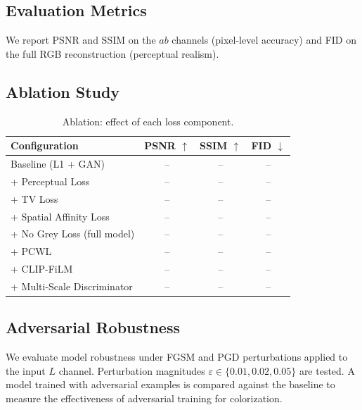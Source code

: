 \documentclass[conference]{IEEEtran}
\begin{document}
\subsection{Evaluation Metrics}

We report PSNR and SSIM on the $ab$ channels (pixel-level accuracy) and
FID \cite{heusel2017gans} on the full RGB reconstruction (perceptual realism).

\subsection{Ablation Study}

\begin{table}[H]
    \centering
    \caption{Ablation: effect of each loss component.}
    \begin{tabular}{lccc}
        \toprule
        \textbf{Configuration} & \textbf{PSNR} $\uparrow$ & \textbf{SSIM} $\uparrow$ & \textbf{FID} $\downarrow$ \\
        \midrule
        Baseline (L1 + GAN)              & -- & -- & -- \\
        + Perceptual Loss                & -- & -- & -- \\
        + TV Loss                        & -- & -- & -- \\
        + Spatial Affinity Loss          & -- & -- & -- \\
        + No Grey Loss (full model)      & -- & -- & -- \\
        + PCWL                           & -- & -- & -- \\
        + CLIP-FiLM                      & -- & -- & -- \\
        + Multi-Scale Discriminator      & -- & -- & -- \\
        \bottomrule
    \end{tabular}
    \label{tab:ablation}
\end{table}

\subsection{Adversarial Robustness}

We evaluate model robustness under FGSM \cite{goodfellow2014explaining} and
PGD \cite{madry2018towards} perturbations applied to the input $L$ channel.
Perturbation magnitudes $\varepsilon \in \{0.01, 0.02, 0.05\}$ are tested.
A model trained with adversarial examples is compared against the baseline to
measure the effectiveness of adversarial training for colorization.
\end{document}
